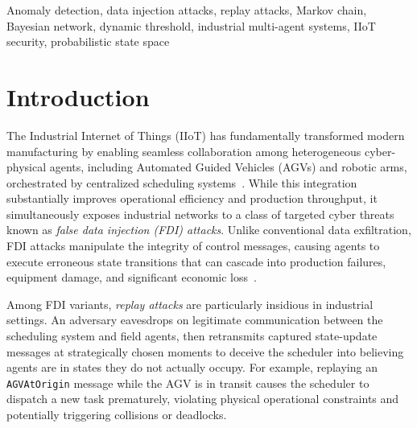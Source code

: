 \documentclass[manuscript,screen,review]{acmart}
\begin{document}
\begin{keywords}
Anomaly detection, data injection attacks, replay attacks,
Markov chain, Bayesian network, dynamic threshold, industrial
multi-agent systems, IIoT security, probabilistic state space
\end{keywords}

\maketitle


\section{Introduction}
\label{sec:intro}

The Industrial Internet of Things (IIoT) has fundamentally
transformed modern manufacturing by enabling seamless collaboration
among heterogeneous cyber-physical agents, including Automated
Guided Vehicles (AGVs) and robotic arms, orchestrated by
centralized scheduling systems~\cite{ref1,ref2}. While this
integration substantially improves operational efficiency and
production throughput, it simultaneously exposes industrial
networks to a class of targeted cyber threats known as
\textit{false data injection (FDI) attacks}. Unlike conventional
data exfiltration, FDI attacks manipulate the integrity of
control messages, causing agents to execute erroneous state
transitions that can cascade into production failures, equipment
damage, and significant economic loss~\cite{ref1,ref2}.

Among FDI variants, \textit{replay attacks} are particularly
insidious in industrial settings. An adversary eavesdrops on
legitimate communication between the scheduling system and field
agents, then retransmits captured state-update messages at
strategically chosen moments to deceive the scheduler into
believing agents are in states they do not actually occupy.
For example, replaying an \texttt{AGVAtOrigin} message while
the AGV is in transit causes the scheduler to dispatch a new
task prematurely, violating physical operational constraints
and potentially triggering collisions or deadlocks.
\end{document}
